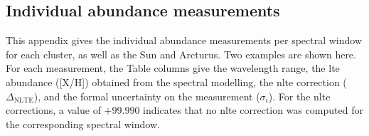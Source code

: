 \documentclass{aa}
\begin{document}
\begin{appendix}
\clearpage

\section{Individual abundance measurements}
\label{app:iam}

This appendix gives the individual abundance measurements per spectral window for each cluster, as well as the Sun and Arcturus. Two examples are shown here. For each measurement, the Table columns give the wavelength range, the \ac{lte} abundance ([X/H]) obtained from the spectral modelling, the \ac{nlte} correction ($\Delta_\mathrm{NLTE}$), and the formal uncertainty on the measurement ($\sigma_i$). 
For the \ac{nlte} corrections, a value of $+99.990$ indicates that no \ac{nlte} correction was computed for the corresponding spectral window. 


\end{appendix}
\end{document}
